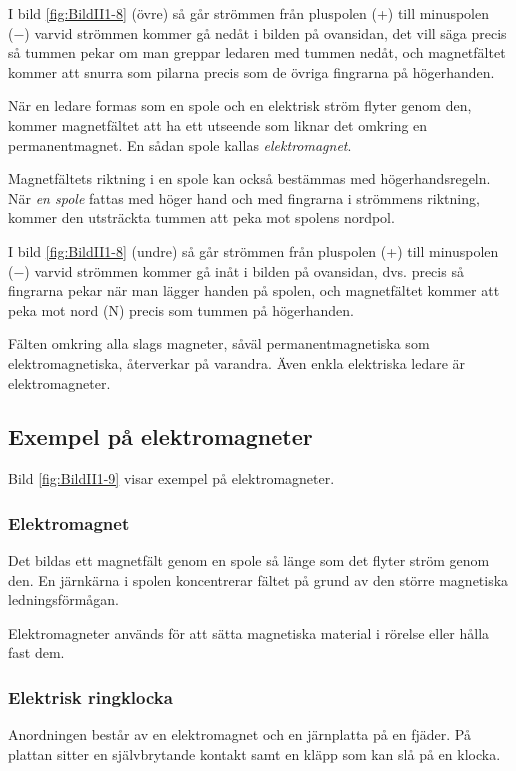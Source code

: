 \begin{multicols}{2}
I bild \ref{fig:BildII1-8} (övre) så går strömmen från pluspolen (+) till
minuspolen (−) varvid strömmen kommer gå nedåt i bilden på ovansidan,
det vill säga precis så tummen pekar om man greppar ledaren med tummen nedåt,
och magnetfältet kommer att snurra som pilarna precis som de övriga fingrarna
på högerhanden.

När en ledare formas som en spole och en elektrisk ström flyter genom den,
kommer magnetfältet att ha ett utseende som liknar det omkring en
permanentmagnet.
En sådan spole kallas \emph{elektromagnet}.

Magnetfältets riktning i en spole kan också bestämmas med högerhandsregeln.
När \emph{en spole} fattas med höger hand och med fingrarna i strömmens
riktning, kommer den utsträckta tummen att peka mot spolens nordpol.

I bild \ref{fig:BildII1-8} (undre) så går strömmen från pluspolen (+) till
minuspolen (−) varvid strömmen kommer gå inåt i bilden på ovansidan, dvs.
precis så fingrarna pekar när man lägger handen på spolen, och magnetfältet
kommer att peka mot nord (N) precis som tummen på högerhanden.

Fälten omkring alla slags magneter, såväl permanentmagnetiska som
elektromagnetiska, återverkar på varandra.
Även enkla elektriska ledare är elektromagneter.

\subsection{Exempel på elektromagneter}


Bild \ref{fig:BildII1-9} visar exempel på elektromagneter.

\subsubsection{Elektromagnet}
Det bildas ett magnetfält genom en spole så länge som det flyter ström genom
den.
En järnkärna i spolen koncentrerar fältet på grund av den större magnetiska
ledningsförmågan.

Elektromagneter används för att sätta magnetiska material i rörelse eller hålla
fast dem.

\subsubsection{Elektrisk ringklocka}
Anordningen består av en elektromagnet och en järnplatta på en fjäder.
På plattan sitter en självbrytande kontakt samt en kläpp som kan slå på en
klocka.


\end{multicols}
